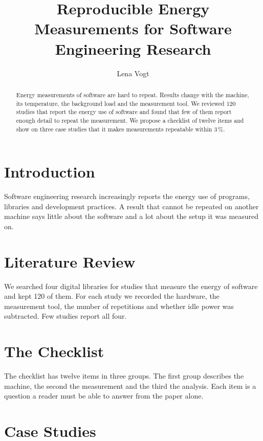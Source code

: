 \documentclass[acmsmall,review,anonymous]{acmart}
\begin{document}
\title{Reproducible Energy Measurements for Software Engineering Research}

\author{Lena Vogt}

\begin{abstract}
Energy measurements of software are hard to repeat. Results change with the
machine, its temperature, the background load and the measurement tool. We
reviewed 120 studies that report the energy use of software and found that
few of them report enough detail to repeat the measurement. We propose a
checklist of twelve items and show on three case studies that it makes
measurements repeatable within 3\,\%.
\end{abstract}

\maketitle

\section{Introduction}

Software engineering research increasingly reports the energy use of
programs, libraries and development practices. A result that cannot be
repeated on another machine says little about the software and a lot about
the setup it was measured on.

\section{Literature Review}

We searched four digital libraries for studies that measure the energy of
software and kept 120 of them. For each study we recorded the hardware, the
measurement tool, the number of repetitions and whether idle power was
subtracted. Few studies report all four.

\section{The Checklist}

The checklist has twelve items in three groups. The first group describes
the machine, the second the measurement and the third the analysis. Each item
is a question a reader must be able to answer from the paper alone.

\section{Case Studies}
\end{document}
